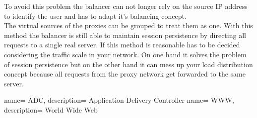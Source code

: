 \documentclass[12p]{article}
\begin{document}
	To avoid this problem the balancer can not longer rely on the source IP address to identify the user and has to adapt it's balancing concept.\\
	The virtual sources of the proxies can be grouped to treat them as one. With this method the balancer is still able to maintain session persistence by directing all requests to a single real server. If this method is reasonable has to be decided considering the traffic scale in your network. On one hand it solves the problem of session persistence but on the other hand it can mess up your load distribution concept because all requests from the proxy network get forwarded to the same server.
	
	\newpage
	\listoffigures
	 {
		name= ADC,
		description= {Application Delivery Controller}
	}
	 {
		name= WWW,
		description= {World Wide Web}
	}
	\printglossaries
	
	\newpage
	
	
	
	\newpage
\end{document}
